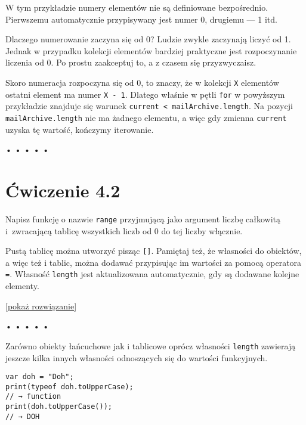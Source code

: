 W tym przykładzie numery elementów nie są definiowane bezpośrednio. Pierwszemu automatycznie przypisywany jest numer 0, drugiemu — 1 itd.

    
Dlaczego numerowanie zaczyna się od 0? Ludzie zwykle zaczynają liczyć od 1. Jednak w przypadku kolekcji elementów bardziej praktyczne jest rozpoczynanie liczenia od 0. Po prostu zaakceptuj to, a z czasem się przyzwyczaisz.

    
Skoro numeracja rozpoczyna się od 0, to znaczy, że w kolekcji \texttt{X} elementów ostatni element ma numer \texttt{X - 1}. Dlatego właśnie w pętli \texttt{for} w powyższym przykładzie znajduje się warunek \texttt{current < mailArchive.length}. Na pozycji \texttt{mailArchive.length} nie ma żadnego elementu, a więc gdy zmienna \texttt{current} uzyska tę wartość, kończymy iterowanie.

  
  
\begin{center}
• • • • •
\end{center}
  
    
\section*{Ćwiczenie 4.2}
\label{sec:4.2}
    
      
Napisz funkcję o nazwie \texttt{range} przyjmującą jako argument liczbę całkowitą i~zwracającą tablicę wszystkich liczb od 0 do tej liczby włącznie.

      
Pustą tablicę można utworzyć pisząc \texttt{[]}. Pamiętaj też, że własności do obiektów, a więc też i tablic, można dodawać przypisując im wartości za pomocą operatora \texttt{=}. Własność \texttt{length} jest aktualizowana automatycznie, gdy są dodawane kolejne elementy.

    
[\hyperref[sol:4.2]{pokaż rozwiązanie}]
    
    
  
  
\begin{center}
• • • • •
\end{center}
  
    
Zarówno obiekty łańcuchowe jak i tablicowe oprócz własności \texttt{length} zawierają jeszcze kilka innych własności odnoszących się do wartości funkcyjnych.

    
\begin{verbatim} 
var doh = "Doh";
print(typeof doh.toUpperCase);
// → function
print(doh.toUpperCase());
// → DOH
\end{verbatim}
    
